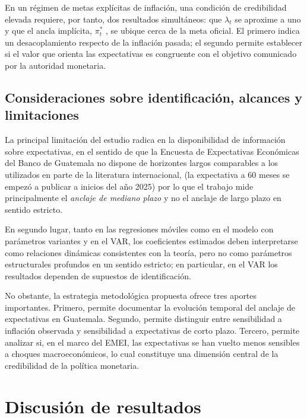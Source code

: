 \documentclass[
  10.5pt,
  letterpaper,
  twocolumn]{article}
\begin{document}
En un régimen de metas explícitas de inflación, una condición de
credibilidad elevada requiere, por tanto, dos resultados simultáneos:
que \(\lambda_t\) se aproxime a uno y que el ancla implícita,
\(\pi_t^{*}\) , se ubique cerca de la meta oficial. El primero indica un
desacoplamiento respecto de la inflación pasada; el segundo permite
establecer si el valor que orienta las expectativas es congruente con el
objetivo comunicado por la autoridad monetaria.

\subsection{Consideraciones sobre identificación, alcances y
limitaciones}\label{consideraciones-sobre-identificaciuxf3n-alcances-y-limitaciones}

La principal limitación del estudio radica en la disponibilidad de
información sobre expectativas, en el sentido de que la Encuesta de
Expectativas Económicas del Banco de Guatemala no dispone de horizontes
largos comparables a los utilizados en parte de la literatura
internacional, (la expectativa a 60 meses se empezó a publicar a inicios
del año 2025) por lo que el trabajo mide principalmente el \emph{anclaje
de mediano plazo} y no el anclaje de largo plazo en sentido estricto.

En segundo lugar, tanto en las regresiones móviles como en el modelo con
parámetros variantes y en el VAR, los coeficientes estimados deben
interpretarse como relaciones dinámicas consistentes con la teoría, pero
no como parámetros estructurales profundos en un sentido estricto; en
particular, en el VAR los resultados dependen de supuestos de
identificación.

No obstante, la estrategia metodológica propuesta ofrece tres aportes
importantes. Primero, permite documentar la evolución temporal del
anclaje de expectativas en Guatemala. Segundo, permite distinguir entre
sensibilidad a inflación observada y sensibilidad a expectativas de
corto plazo. Tercero, permite analizar si, en el marco del EMEI, las
expectativas se han vuelto menos sensibles a choques macroeconómicos, lo
cual constituye una dimensión central de la credibilidad de la política
monetaria.

\section{Discusión de resultados}\label{discusiuxf3n-de-resultados}
\end{document}
